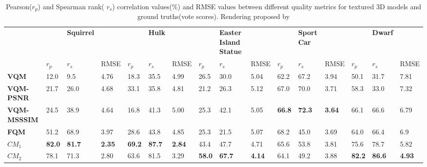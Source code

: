 \begin{table}[]
\centering
\caption{Pearson($r_p$) and Spearman rank( $r_s$) correlation values(\%) and RMSE values between different quality metrics for textured 3D models and ground truths(vote scores). Rendering proposed by \cite{Rogowitz_2001}}
\label{my-label}
\begin{tabular}{llllllllllllllll}
                    &      & \textbf{Squirrel} & \textbf{} & \textbf{} & \textbf{Hulk} & \textbf{} & \textbf{} & \textbf{Easter Island Statue} & \textbf{} & \textbf{} & \textbf{Sport Car} & \textbf{} & \textbf{} & \textbf{Dwarf} &      \\
                     & $r_p$                & $r_s$           & RMSE & $r_p$                & $r_s$            & RMSE & $r_p$                & $r_s$            & RMSE &$r_p$                & $r_s$            & RMSE      & $r_p$                & $r_s$             & RMSE \\
\textbf{VQM}        & 12.0          & 9.5               & 4.76          & 18.3          & 35.5          & 4.99          & 26.5          & 30.0                          & 5.04          & 62.2          & 67.2               & 3.94          & 50.1          & 31.7           & 7.81          \\
\textbf{VQM-PSNR}   & 21.7          & 26.0              & 4.68          & 33.1          & 35.8          & 4.81          & 21.2          & 26.3                          & 5.12          & 67.0          & 70.0               & 3.71          & 58.3          & 33.0           & 7.32          \\
\textbf{VQM-MSSSIM} & 24.5          & 38.9              & 4.64          & 16.8          & 41.3          & 5.00          & 25.3          & 42.1                          & 5.05          & \textbf{66.8} & \textbf{72.3}      & \textbf{3.64} & 66.1          & 66.6           & 6.79          \\
\textbf{FQM}        & 51.2          & 68.9              & 3.97          & 28.6          & 43.8          & 4.85          & 25.3          & 21.5                          & 5.07          & 68.2          & 45.0               & 3.69          & 64.0          & 66.4           & 6.9           \\
$CM_1$                 & \textbf{82.0} & \textbf{81.7}     & \textbf{2.35} & \textbf{69.2} & \textbf{87.7} & \textbf{2.84} & 43.4          & 47.7                          & 4.71          & 65.6          & 53.8               & 3.81          & 75.6          & 78.7           & 5.82          \\
$CM_2$                 & 78.1          & 71.3              & 2.80          & 63.6          & 81.5          & 3.29          & \textbf{58.0} & \textbf{67.7}                 & \textbf{4.14} & 64.1          & 49.2               & 3.88          & \textbf{82.2} & \textbf{86.6}  & \textbf{4.93}
\end{tabular}
\end{table}
